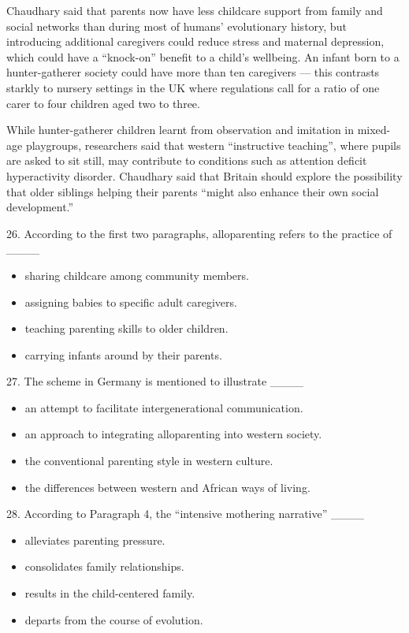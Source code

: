 \documentclass[UTF8,11pt]{ctexart}
\begin{document}
Chaudhary said that parents now have less childcare support from family and social networks than during most of humans’ evolutionary history, but introducing additional caregivers could reduce stress and maternal depression, which could have a “knock-on” benefit to a child’s wellbeing. An infant born to a hunter-gatherer society could have more than ten caregivers — this contrasts starkly to nursery settings in the UK where regulations call for a ratio of one carer to four children aged two to three.


While hunter-gatherer children learnt from observation and imitation in mixed-age playgroups, researchers said that western “instructive teaching”, where pupils are asked to sit still, may contribute to conditions such as attention deficit hyperactivity disorder. Chaudhary said that Britain should explore the possibility that older siblings helping their parents “might also enhance their own social development.”


26. According to the first two paragraphs, alloparenting refers to the practice of \_\_\_\_


\begin{itemize}[leftmargin=2em,itemsep=.2em,topsep=.4em]\item[A.] sharing childcare among community members.
\item[B.] assigning babies to specific adult caregivers.
\item[C.] teaching parenting skills to older children.
\item[D.] carrying infants around by their parents.
\end{itemize}

27. The scheme in Germany is mentioned to illustrate \_\_\_\_


\begin{itemize}[leftmargin=2em,itemsep=.2em,topsep=.4em]\item[A.] an attempt to facilitate intergenerational communication.
\item[B.] an approach to integrating alloparenting into western society.
\item[C.] the conventional parenting style in western culture.
\item[D.] the differences between western and African ways of living.
\end{itemize}

28. According to Paragraph 4, the “intensive mothering narrative” \_\_\_\_


\begin{itemize}[leftmargin=2em,itemsep=.2em,topsep=.4em]\item[A.] alleviates parenting pressure.
\item[B.] consolidates family relationships.
\item[C.] results in the child-centered family.
\item[D.] departs from the course of evolution.
\end{itemize}
\end{document}

